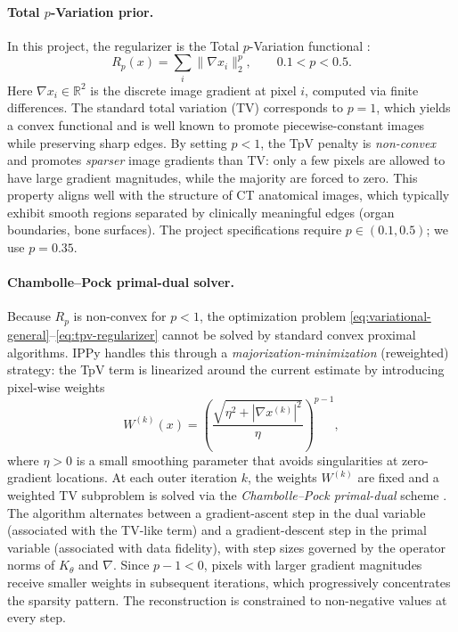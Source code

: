 \documentclass[11pt,a4paper]{article}
\begin{document}
\paragraph{Total $p$-Variation prior.}
In this project, the regularizer is the Total $p$-Variation functional
\cite{rudin1992nonlinear}:
\begin{equation}
  R_p(x)
  =
  \sum_i \|\nabla x_i\|_2^p,
  \qquad
  0.1 < p < 0.5.
  \label{eq:tpv-regularizer}
\end{equation}
Here $\nabla x_i \in \mathbb{R}^2$ is the discrete image gradient at pixel $i$,
computed via finite differences. The standard total variation (TV) corresponds
to $p=1$, which yields a convex functional and is well known to promote
piecewise-constant images while preserving sharp edges. By setting $p < 1$,
the TpV penalty is \emph{non-convex} and promotes \emph{sparser} image
gradients than TV: only a few pixels are allowed to have large gradient
magnitudes, while the majority are forced to zero. This property aligns well
with the structure of CT anatomical images, which typically exhibit smooth
regions separated by clinically meaningful edges (organ boundaries,
bone surfaces). The project specifications require $p \in (0.1, 0.5)$; we
use $p = 0.35$.

\paragraph{Chambolle--Pock primal-dual solver.}
Because $R_p$ is non-convex for $p < 1$, the optimization problem
\eqref{eq:variational-general}--\eqref{eq:tpv-regularizer} cannot be solved
by standard convex proximal algorithms. IPPy handles this through a
\emph{majorization-minimization} (reweighted) strategy: the TpV term is
linearized around the current estimate by introducing pixel-wise weights
\begin{equation}
  W^{(k)}(x)
  =
  \left(
  \frac{\sqrt{\eta^2 + |\nabla x^{(k)}|^2}}{\eta}
  \right)^{p-1},
  \label{eq:tpv-weight}
\end{equation}
where $\eta > 0$ is a small smoothing parameter that avoids singularities at
zero-gradient locations. At each outer iteration $k$, the weights $W^{(k)}$ are
fixed and a weighted TV subproblem is solved via the
\emph{Chambolle--Pock primal-dual} scheme \cite{chambolle2011first}. The
algorithm alternates between a gradient-ascent step in the dual variable
(associated with the TV-like term) and a gradient-descent step in the primal
variable (associated with data fidelity), with step sizes governed by the
operator norms of $K_\theta$ and $\nabla$. Since $p - 1 < 0$, pixels with
larger gradient magnitudes receive smaller weights in subsequent iterations,
which progressively concentrates the sparsity pattern. The reconstruction is
constrained to non-negative values at every step.
\end{document}
